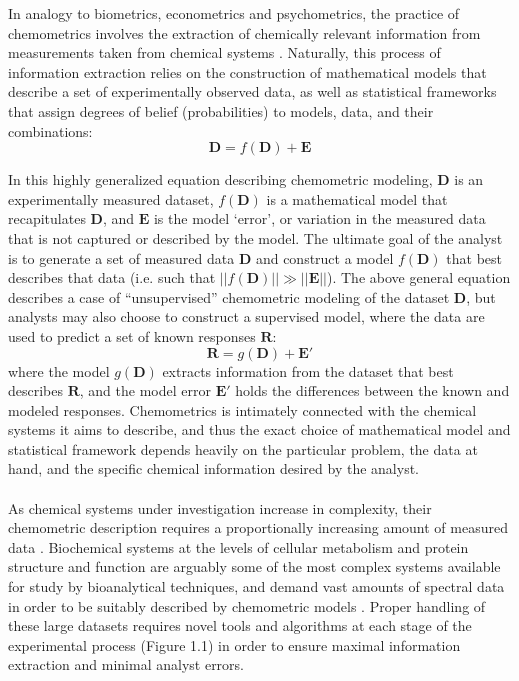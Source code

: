 \begin{doublespace}
In analogy to biometrics, econometrics and psychometrics, the practice of
chemometrics involves the extraction of chemically relevant information from
measurements taken from chemical systems \cite{wold:cils1995}.
Naturally, this process of information extraction relies on the construction of
mathematical models that describe a set of experimentally observed data, as
well as statistical frameworks that assign degrees of belief (probabilities)
to models, data, and their combinations:
\begin{equation*}
\mathbf{D} = f(\mathbf{D}) + \mathbf{E}
\end{equation*}

In this highly generalized equation describing chemometric modeling,
$\mathbf{D}$ is an experimentally measured dataset, $f(\mathbf{D})$ is
a mathematical model that recapitulates $\mathbf{D}$, and $\mathbf{E}$ is
the model `error', or variation in the measured data that is not
captured or described by the model. The ultimate goal of the analyst is to
generate a set of measured data $\mathbf{D}$ and construct a model
$f(\mathbf{D})$ that best describes that data (i.e. such that
$||f(\mathbf{D})|| \gg ||\mathbf{E}||$). The above general equation describes
a case of ``unsupervised'' chemometric modeling of the dataset $\mathbf{D}$,
but analysts may also choose to construct a supervised model, where the data
are used to predict a set of known responses $\mathbf{R}$:
\begin{equation*}
\mathbf{R} = g(\mathbf{D}) + \mathbf{E}'
\end{equation*}
where the model $g(\mathbf{D})$ extracts information from the dataset that best
describes $\mathbf{R}$, and the model error $\mathbf{E}'$ holds the differences
between the known and modeled responses. Chemometrics is intimately connected
with the chemical systems it aims to describe, and thus the exact choice
of mathematical model and statistical framework depends heavily on the
particular problem, the data at hand, and the specific chemical information
desired by the analyst.
\\\\
As chemical systems under investigation increase in complexity, their
chemometric description requires a proportionally increasing amount of
measured data \cite{wold:cils1995}. Biochemical systems at the
levels of cellular metabolism and protein structure and function are
arguably some of the most complex systems available for study by
bioanalytical techniques, and demand vast amounts of spectral data
in order to be suitably described by chemometric models
\cite{
  wutrich:jmolb1982,
  kay:jmr2005,
  lindon:cmr2000,
  chen:rcms2006,
  han:metab2008,
  barding:jacs2012,
  baker:mmbio2012,
  marshall:metab2015}. Proper handling of these large datasets requires novel
tools and algorithms at each stage of the experimental process (Figure 1.1) in
order to ensure maximal information extraction and minimal analyst errors.
\end{doublespace}

